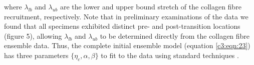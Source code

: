     where $\lambda_{lb}$ and $\lambda_{ub}$ are the lower and upper bound stretch of the collagen fibre recruitment, respectively. Note that in preliminary examinations of the data we found that all specimens exhibited distinct pre- and post-transition locations (figure 5), allowing $\lambda_{lb}$ and $\lambda_{ub}$ to be determined directly from the collagen fibre ensemble data. Thus, the complete initial ensemble model (equation \ref{c3:eqn:23}) has three parameters $\{\eta_c, \alpha, \beta\}$ to fit to the data using standard techniques \cite{fata_insights_2014}.
    
    
    